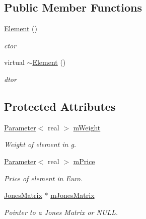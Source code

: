 \subsection*{Public Member Functions}
\begin{DoxyCompactItemize}
\item 
\hyperlink{classElement_ab0d0e20be9a36ae676202db753faeec9}{Element} ()\hypertarget{classElement_ab0d0e20be9a36ae676202db753faeec9}{}\label{classElement_ab0d0e20be9a36ae676202db753faeec9}

\begin{DoxyCompactList}\small\item\em ctor \end{DoxyCompactList}\item 
virtual \hyperlink{classElement_a13d54ba9c08b6bec651402f1c2bb002c}{$\sim$\+Element} ()\hypertarget{classElement_a13d54ba9c08b6bec651402f1c2bb002c}{}\label{classElement_a13d54ba9c08b6bec651402f1c2bb002c}

\begin{DoxyCompactList}\small\item\em dtor \end{DoxyCompactList}\end{DoxyCompactItemize}
\subsection*{Protected Attributes}
\begin{DoxyCompactItemize}
\item 
\hyperlink{classParameter}{Parameter}$<$ real $>$ \hyperlink{classElement_a69ec3816139f3e3664ddc8ee7686406d}{m\+Weight}\hypertarget{classElement_a69ec3816139f3e3664ddc8ee7686406d}{}\label{classElement_a69ec3816139f3e3664ddc8ee7686406d}

\begin{DoxyCompactList}\small\item\em Weight of element in g. \end{DoxyCompactList}\item 
\hyperlink{classParameter}{Parameter}$<$ real $>$ \hyperlink{classElement_a0ba80b79bb7b1280510eb9f66eda786b}{m\+Price}\hypertarget{classElement_a0ba80b79bb7b1280510eb9f66eda786b}{}\label{classElement_a0ba80b79bb7b1280510eb9f66eda786b}

\begin{DoxyCompactList}\small\item\em Price of element in Euro. \end{DoxyCompactList}\item 
\hyperlink{classJonesMatrix}{Jones\+Matrix} $\ast$ \hyperlink{classElement_a62fb95690c351f1adb1bb642f8f6d150}{m\+Jones\+Matrix}\hypertarget{classElement_a62fb95690c351f1adb1bb642f8f6d150}{}\label{classElement_a62fb95690c351f1adb1bb642f8f6d150}

\begin{DoxyCompactList}\small\item\em Pointer to a Jones Matrix or N\+U\+LL. \end{DoxyCompactList}\end{DoxyCompactItemize}


